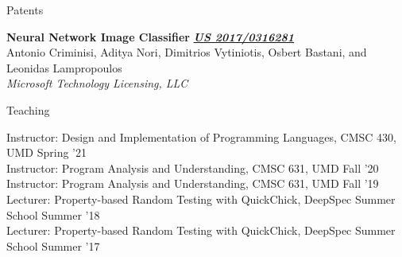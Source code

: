 \documentclass{resume} %
\begin{document}

\begin{rSection}{Patents}

{\bf Neural Network Image Classifier} \hfill {\href{https://patentimages.storage.googleapis.com/44/ec/9f/3f90c94a602fda/US20170316281A1.pdf}{\bf \em US 2017/0316281}}\\
Antonio Criminisi, Aditya Nori, Dimitrios Vytiniotis, Osbert Bastani, and Leonidas Lampropoulos\\
{\em Microsoft Technology Licensing, LLC}

  
\end{rSection}


\newcommand{\teach}[3]{
  {#1: #2} \hfill #3 \\
  }

\begin{rSection}{Teaching}

  \teach{Instructor}{Design and Implementation of Programming Languages, CMSC 430, UMD}{Spring '21}  
  \teach{Instructor}{Program Analysis and Understanding, CMSC 631, UMD}{Fall '20}
  \teach{Instructor}{Program Analysis and Understanding, CMSC 631, UMD}{Fall '19}
  \teach{Lecturer}{Property-based Random Testing with QuickChick, DeepSpec Summer School}{Summer '18}
  \teach{Lecturer}{Property-based Random Testing with QuickChick, DeepSpec Summer School}{Summer '17}  
\end{rSection}



\newcommand{\talk}[3]{
  {\bf #1} \\ %
  {#3}
  }
\end{document}
